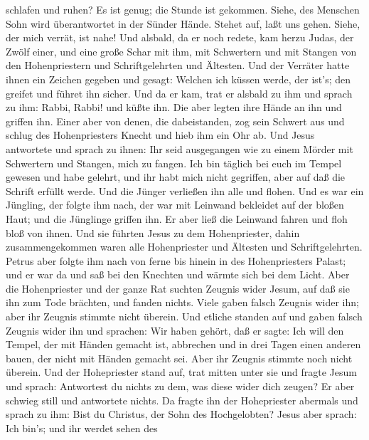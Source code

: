 schlafen und ruhen? Es ist genug; die Stunde ist gekommen. Siehe, des
Menschen Sohn wird überantwortet in der Sünder Hände. 
Stehet auf, laßt uns gehen. Siehe, der mich verrät, ist nahe!
 Und alsbald, da er noch redete, kam herzu Judas, der Zwölf
einer, und eine große Schar mit ihm, mit Schwertern und mit Stangen von
den Hohenpriestern und Schriftgelehrten und Ältesten.  Und
der Verräter hatte ihnen ein Zeichen gegeben und gesagt: Welchen ich
küssen werde, der ist's; den greifet und führet ihn sicher.
 Und da er kam, trat er alsbald zu ihm und sprach zu ihm:
Rabbi, Rabbi! und küßte ihn.  Die aber legten ihre Hände an
ihn und griffen ihn.  Einer aber von denen, die
dabeistanden, zog sein Schwert aus und schlug des Hohenpriesters Knecht
und hieb ihm ein Ohr ab.  Und Jesus antwortete und sprach
zu ihnen: Ihr seid ausgegangen wie zu einem Mörder mit Schwertern und
Stangen, mich zu fangen.  Ich bin täglich bei euch im
Tempel gewesen und habe gelehrt, und ihr habt mich nicht gegriffen, aber
auf daß die Schrift erfüllt werde.  Und die Jünger
verließen ihn alle und flohen.  Und es war ein Jüngling,
der folgte ihm nach, der war mit Leinwand bekleidet auf der bloßen Haut;
und die Jünglinge griffen ihn.  Er aber ließ die Leinwand
fahren und floh bloß von ihnen.  Und sie führten Jesus zu
dem Hohenpriester, dahin zusammengekommen waren alle Hohenpriester und
Ältesten und Schriftgelehrten.  Petrus aber folgte ihm nach
von ferne bis hinein in des Hohenpriesters Palast; und er war da und saß
bei den Knechten und wärmte sich bei dem Licht.  Aber die
Hohenpriester und der ganze Rat suchten Zeugnis wider Jesum, auf daß sie
ihn zum Tode brächten, und fanden nichts.  Viele gaben
falsch Zeugnis wider ihn; aber ihr Zeugnis stimmte nicht überein.
 Und etliche standen auf und gaben falsch Zeugnis wider ihn
und sprachen:  Wir haben gehört, daß er sagte: Ich will den
Tempel, der mit Händen gemacht ist, abbrechen und in drei Tagen einen
anderen bauen, der nicht mit Händen gemacht sei.  Aber ihr
Zeugnis stimmte noch nicht überein.  Und der Hohepriester
stand auf, trat mitten unter sie und fragte Jesum und sprach: Antwortest
du nichts zu dem, was diese wider dich zeugen?  Er aber
schwieg still und antwortete nichts. Da fragte ihn der Hohepriester
abermals und sprach zu ihm: Bist du Christus, der Sohn des Hochgelobten?
 Jesus aber sprach: Ich bin's; und ihr werdet sehen des
